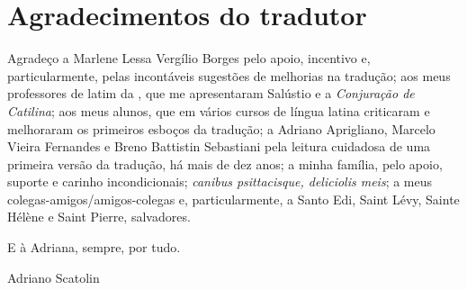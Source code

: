 \section{Agradecimentos do tradutor}

 
Agradeço a Marlene Lessa Vergílio Borges pelo apoio, incentivo e,
particularmente,  pelas  incontáveis sugestões de melhorias na tradução; aos
meus professores de latim da , que me apresentaram Salústio e a
\emph{Conjuração de Catilina}; aos meus alunos, que em vários
cursos de língua latina criticaram e melhoraram os primeiros esboços da tradução; a Adriano Aprigliano, Marcelo Vieira Fernandes e Breno Battistin Sebastiani pela leitura cuidadosa de uma primeira versão da tradução, há mais de dez anos; a
minha família, pelo apoio, suporte e carinho incondicionais; \emph{canibus psittacisque, deliciolis meis}; a meus colegas-amigos/amigos-colegas e, particularmente, a Santo
Edi, Saint Lévy, Sainte Hélène e Saint Pierre,  salvadores.

E à Adriana, sempre, por tudo. 

\bigskip
\hfill Adriano Scatolin 


